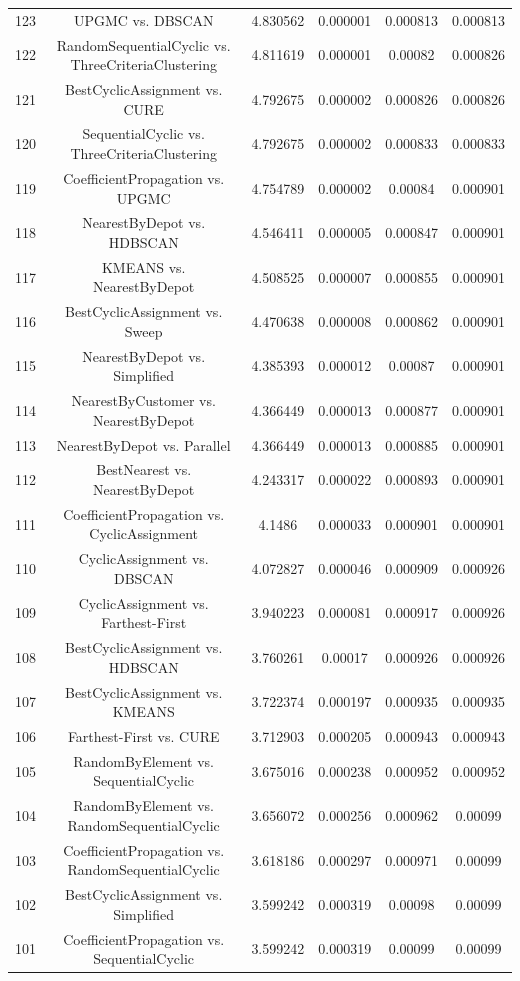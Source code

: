 \documentclass[a4paper,10pt]{article}
\begin{document}
\begin{landscape}
\begin{table}[!htp]
\begin{tabular}{cccccc}
123&UPGMC vs. DBSCAN&4.830562&0.000001&0.000813&0.000813\\
122&RandomSequentialCyclic vs. ThreeCriteriaClustering&4.811619&0.000001&0.00082&0.000826\\
121&BestCyclicAssignment vs. CURE&4.792675&0.000002&0.000826&0.000826\\
120&SequentialCyclic vs. ThreeCriteriaClustering&4.792675&0.000002&0.000833&0.000833\\
119&CoefficientPropagation vs. UPGMC&4.754789&0.000002&0.00084&0.000901\\
118&NearestByDepot vs. HDBSCAN&4.546411&0.000005&0.000847&0.000901\\
117&KMEANS vs. NearestByDepot&4.508525&0.000007&0.000855&0.000901\\
116&BestCyclicAssignment vs. Sweep&4.470638&0.000008&0.000862&0.000901\\
115&NearestByDepot vs. Simplified&4.385393&0.000012&0.00087&0.000901\\
114&NearestByCustomer vs. NearestByDepot&4.366449&0.000013&0.000877&0.000901\\
113&NearestByDepot vs. Parallel&4.366449&0.000013&0.000885&0.000901\\
112&BestNearest vs. NearestByDepot&4.243317&0.000022&0.000893&0.000901\\
111&CoefficientPropagation vs. CyclicAssignment&4.1486&0.000033&0.000901&0.000901\\
110&CyclicAssignment vs. DBSCAN&4.072827&0.000046&0.000909&0.000926\\
109&CyclicAssignment vs. Farthest-First&3.940223&0.000081&0.000917&0.000926\\
108&BestCyclicAssignment vs. HDBSCAN&3.760261&0.00017&0.000926&0.000926\\
107&BestCyclicAssignment vs. KMEANS&3.722374&0.000197&0.000935&0.000935\\
106&Farthest-First vs. CURE&3.712903&0.000205&0.000943&0.000943\\
105&RandomByElement vs. SequentialCyclic&3.675016&0.000238&0.000952&0.000952\\
104&RandomByElement vs. RandomSequentialCyclic&3.656072&0.000256&0.000962&0.00099\\
103&CoefficientPropagation vs. RandomSequentialCyclic&3.618186&0.000297&0.000971&0.00099\\
102&BestCyclicAssignment vs. Simplified&3.599242&0.000319&0.00098&0.00099\\
101&CoefficientPropagation vs. SequentialCyclic&3.599242&0.000319&0.00099&0.00099\\

\end{tabular}
\end{table}
\end{landscape}
\end{document}

